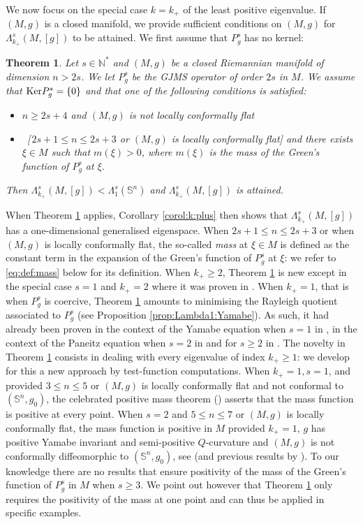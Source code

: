 \documentclass[10pt]{amsart}
\numberwithin{equation}{section}
\def\La{{\Lambda}}
\def\ker{{\mathop{\rm Ker}}}
\theoremstyle{plain}
\newtheorem{theo}{Theorem}[section]%
\theoremstyle{remark}
\begin{document}
We now focus on the special case $k=k_+$ of the least positive eigenvalue. If $(M,g)$ is a closed manifold, we provide sufficient conditions on $(M,g)$ for $\La_{k_+}^s(M,[g])$ to be attained. We first assume that $P_g^s$ has no kernel: 
\begin{theo} \label{prop:kplus:atteint}
Let $s \in \mathbb{N}^*$ and $(M,g)$ be a closed Riemannian manifold of dimension $n > 2s$. We let $P_g^s$ be the GJMS operator of order $2s$ in $M$. We assume that $\ker P_g^s = \{0\}$ and that one of the following conditions is satisfied:
\begin{itemize}
\item $n \ge 2s + 4$ and $(M,g)$ is not locally conformally flat
\item~[\,$2s+1 \le n \le 2s+3$ or $(M,g)$ is locally conformally flat]   and there exists $\xi \in M$ such that $m(\xi) >0$, where $m(\xi)$ is the mass of the Green's function of $P_g^s$ at $\xi$.
\end{itemize}
Then $ \Lambda_{k_+}^s(M,[g]) < \Lambda_1^s(\mathbb{S}^n)$ and  $\Lambda_{k_+}^s(M,[g])$ is attained. 
\end{theo}
When Theorem \ref{prop:kplus:atteint} applies, Corollary \ref{corol:k:plus} then shows that $ \Lambda_{k_+}^s(M,[g])$ has a one-dimensional generalised eigenspace. When $2s+1 \le n \le 2s+3$ or when $(M,g)$ is locally conformally flat, the so-called \emph{mass} at $\xi \in M$ is defined as the constant term in the expansion of the Green's function of $P_g^s$ at $\xi$: we refer to \eqref{eq:def:mass} below for its definition. When $k_+ \ge 2$, Theorem \ref{prop:kplus:atteint} is new except in the special case $s=1$ and $k_+ =2$ where it was proven in \cite{ElSayed}. When $k_+=1$, that is when $P_g^s$ is coercive, Theorem \ref{prop:kplus:atteint} amounts to minimising the Rayleigh quotient associated to $P_g^s$ (see Proposition \ref{prop:Lambda1:Yamabe}). As such, it had already been proven in the context of the Yamabe equation when $s=1$ in \cite{AubinYamabe, SchoenYamabe}, in the context of the Paneitz equation when $s=2$ in \cite{DjadliHebeyLedoux, EspositoRobert, GurskyHangLin, GurskyMalchiodi, HangYang} and for $s \ge 2$ in  \cite{MazumdarVetois}. The novelty in Theorem \ref{prop:kplus:atteint} consists in dealing with every eigenvalue of index $k_+ \ge 1$: we develop for this a new approach by test-function computations. When $k_+ = 1, s=1$, and provided $3 \le n \le 5$ or $(M,g)$ is locally conformally flat and not conformal to $(\mathbb{S}^n, g_0)$, the celebrated positive mass theorem (\cite{SchoenYau, LeeParker}) asserts that the mass function is positive at every point. When $s=2$ and $5 \le n \le 7$ or $(M,g)$ is locally conformally flat,  the mass function is positive in $M$ provided $k_+=1$, $g$ has positive Yamabe invariant and semi-positive $Q$-curvature and $(M,g)$ is not conformally diffeomorphic to $(\mathbb{S}^n, g_0)$, see \cite{HangYang} (and previous results by \cite{GurskyMalchiodi, HumbertRaulot, Michel}). To our knowledge there are no results that ensure positivity of the mass of the Green's function of $P_g^s$ in $M$ when $s \ge 3$. We point out however that Theorem \ref{prop:kplus:atteint} only requires the positivity of the mass at one point and can thus be applied in specific examples. 
\end{document}
